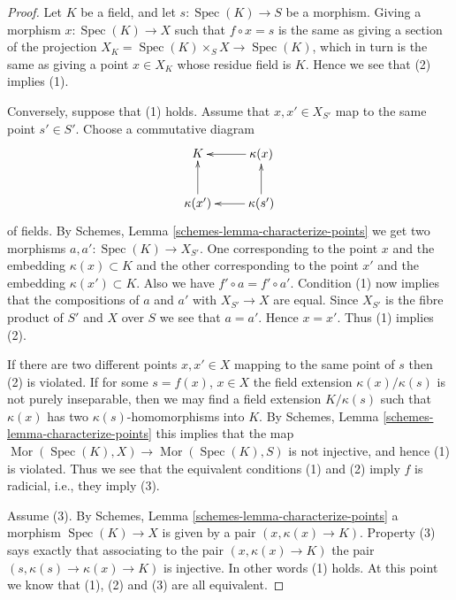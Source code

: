 \documentclass[10pt,a4paper]{amsart}
\theoremstyle{plain}
\theoremstyle{definition}
\theoremstyle{remark}
\numberwithin{equation}{subsection}
\def\Spec{\mathop{\mathrm{Spec}}}
\def\Mor{\mathop{\mathrm{Mor}}\nolimits}
\begin{document}
\begin{proof}
Let $K$ be a field, and let $s : \Spec(K) \to S$ be a morphism.
Giving a morphism $x : \Spec(K) \to X$ such that $f \circ x = s$
is the same as giving a section of the projection
$X_K = \Spec(K) \times_S X \to \Spec(K)$, which in turn
is the same as giving a point $x \in X_K$ whose residue field is $K$.
Hence we see that (2) implies (1).

\medskip\noindent
Conversely, suppose that (1) holds. Assume that $x, x' \in X_{S'}$
map to the same point $s' \in S'$. Choose a commutative diagram
$$
\xymatrix{
K & \kappa(x) \ar[l] \\
\kappa(x') \ar[u] & \kappa(s') \ar[l] \ar[u]
}
$$
of fields. By Schemes, Lemma \ref{schemes-lemma-characterize-points}
we get two morphisms $a, a' : \Spec(K) \to X_{S'}$. One corresponding
to the point $x$ and the embedding $\kappa(x) \subset K$ and
the other corresponding to the  point $x'$ and the embedding
$\kappa(x') \subset K$. Also we have $f' \circ a = f' \circ a'$.
Condition (1) now implies that the compositions of $a$ and $a'$ with
$X_{S'} \to X$ are equal. Since $X_{S'}$ is the fibre product
of $S'$ and $X$ over $S$ we see that $a = a'$. Hence $x = x'$.
Thus (1) implies (2).

\medskip\noindent
If there are two different points $x, x' \in X$ mapping to the same point of $s$
then (2) is violated.
If for some $s = f(x)$, $x \in X$ the field extension
$\kappa(x)/\kappa(s)$ is not purely inseparable, then
we may find a field extension $K/\kappa(s)$ such that
$\kappa(x)$ has two $\kappa(s)$-homomorphisms into $K$. By
Schemes, Lemma \ref{schemes-lemma-characterize-points} this
implies that the map
$\Mor(\Spec(K), X) \to \Mor(\Spec(K), S)$
is not injective, and hence (1) is violated.
Thus we see that the equivalent conditions (1) and (2) imply
$f$ is radicial, i.e., they imply (3).

\medskip\noindent
Assume (3). By
Schemes, Lemma \ref{schemes-lemma-characterize-points}
a morphism $\Spec(K) \to X$ is given by a pair $(x, \kappa(x) \to K)$.
Property (3) says exactly that associating to the pair
$(x, \kappa(x) \to K)$ the pair $(s, \kappa(s) \to \kappa(x) \to K)$
is injective. In other words (1) holds. At this point we know that
(1), (2) and (3) are all equivalent.


\end{proof}
\end{document}
